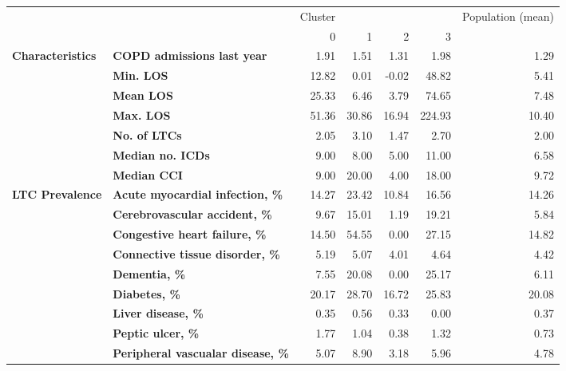 \begin{tabular}{llrrrrr}
\toprule
               &           & Cluster &         &         &         & Population (mean) \\
               &           &       0 &       1 &       2 &       3 &                   \\
\midrule
\textbf{Characteristics} & \textbf{COPD admissions last year} &    1.91 &    1.51 &    1.31 &    1.98 &              1.29 \\
               & \textbf{Min. LOS} &   12.82 &    0.01 &   -0.02 &   48.82 &              5.41 \\
               & \textbf{Mean LOS} &   25.33 &    6.46 &    3.79 &   74.65 &              7.48 \\
               & \textbf{Max. LOS} &   51.36 &   30.86 &   16.94 &  224.93 &             10.40 \\
               & \textbf{No. of LTCs} &    2.05 &    3.10 &    1.47 &    2.70 &              2.00 \\
               & \textbf{Median no. ICDs} &    9.00 &    8.00 &    5.00 &   11.00 &              6.58 \\
               & \textbf{Median CCI} &    9.00 &   20.00 &    4.00 &   18.00 &              9.72 \\
\textbf{LTC Prevalence} & \textbf{Acute myocardial infection, \%} &   14.27 &   23.42 &   10.84 &   16.56 &             14.26 \\
               & \textbf{Cerebrovascular accident, \%} &    9.67 &   15.01 &    1.19 &   19.21 &              5.84 \\
               & \textbf{Congestive heart failure, \%} &   14.50 &   54.55 &    0.00 &   27.15 &             14.82 \\
               & \textbf{Connective tissue disorder, \%} &    5.19 &    5.07 &    4.01 &    4.64 &              4.42 \\
               & \textbf{Dementia, \%} &    7.55 &   20.08 &    0.00 &   25.17 &              6.11 \\
               & \textbf{Diabetes, \%} &   20.17 &   28.70 &   16.72 &   25.83 &             20.08 \\
               & \textbf{Liver disease, \%} &    0.35 &    0.56 &    0.33 &    0.00 &              0.37 \\
               & \textbf{Peptic ulcer, \%} &    1.77 &    1.04 &    0.38 &    1.32 &              0.73 \\
               & \textbf{Peripheral vascualar disease, \%} &    5.07 &    8.90 &    3.18 &    5.96 &              4.78 \\

\end{tabular}
